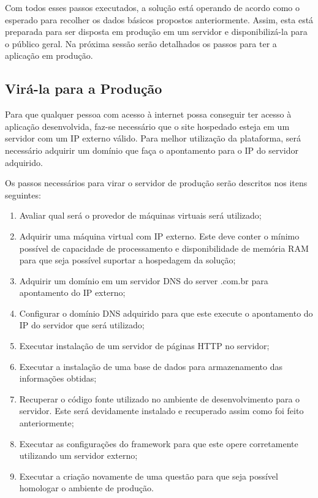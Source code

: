 Com todos esses passos executados, a solução está operando de acordo como o esperado para recolher os dados básicos propostos anteriormente.
Assim, esta está preparada para ser disposta em produção em um servidor e disponibilizá-la para o público geral. Na próxima sessão serão
detalhados os passos para ter a aplicação em produção.

\subsection{Virá-la para a Produção}
\label{sub:definir_tecnologia}
Para que qualquer pessoa com acesso à internet possa conseguir ter acesso à aplicação desenvolvida, faz-se necessário que
o site hospedado esteja em um servidor com um IP externo válido. Para melhor utilização da plataforma, será necessário adquirir um domínio
que faça o apontamento para o IP do servidor adquirido. 

Os passos necessários para virar o servidor de produção serão descritos nos itens seguintes:

\begin{enumerate}
    \item Avaliar qual será o provedor de máquinas virtuais será utilizado;
    \item Adquirir uma máquina virtual com IP externo. Este deve conter o mínimo possível de capacidade de processamento e
        disponibilidade de memória RAM para que seja possível suportar a hospedagem da solução;
    \item Adquirir um domínio em um servidor DNS do server .com.br para apontamento do IP externo;
    \item Configurar o domínio DNS adquirido para que este execute o apontamento do IP do servidor que será utilizado;
    \item Executar instalação de um servidor de páginas HTTP no servidor;
    \item Executar a instalação de uma base de dados para armazenamento das informações obtidas;
    \item Recuperar o código fonte utilizado no ambiente de desenvolvimento para o servidor. Este será devidamente
        instalado e recuperado assim como foi feito anteriormente;
    \item Executar as configurações do framework para que este opere corretamente utilizando um servidor externo;
    \item Executar a criação novamente de uma questão para que seja possível homologar o ambiente de produção.
\end{enumerate}

